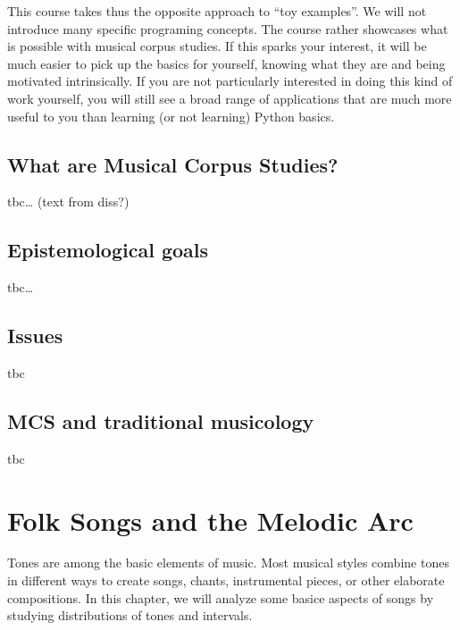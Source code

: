 \documentclass[letterpaper,10pt,english]{sphinxmanual}
\begin{document}
This course takes thus the opposite approach to “toy examples”. We will not introduce many specific
programing concepts. The course rather showcases what is possible with musical corpus studies.
If this sparks your interest, it will be much easier to pick up the basics for yourself,
knowing what they are  and being motivated intrinsically.
If you are not particularly interested in doing this kind of work yourself,
you will still see a broad range of applications that are much more useful to you than
learning (or not learning) Python basics.


\section{What are Musical Corpus Studies?}
\label{\detokenize{2_introduction:what-are-musical-corpus-studies}}
tbc… (text from diss?)


\section{Epistemological goals}
\label{\detokenize{2_introduction:epistemological-goals}}
tbc…


\section{Issues}
\label{\detokenize{2_introduction:issues}}
tbc 


\section{MCS and traditional musicology}
\label{\detokenize{2_introduction:mcs-and-traditional-musicology}}
tbc


\chapter{Folk Songs and the Melodic Arc}
\label{\detokenize{3_folk_songs:folk-songs-and-the-melodic-arc}}\label{\detokenize{3_folk_songs::doc}}
Tones are among the basic elements of music. Most musical styles combine tones in different ways
to create songs, chants, instrumental pieces, or other elaborate compositions.
In this chapter, we will analyze some basice aspects of songs by studying distributions of tones and intervals.
\end{document}
